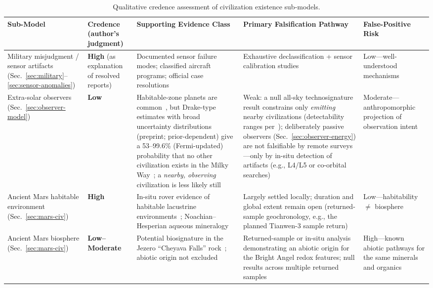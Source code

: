 \documentclass[aps,prd,twocolumn,superscriptaddress,nofootinbib]{revtex4-2}
\begin{document}
\begin{table}[htbp]
\caption{Qualitative credence assessment of civilization existence sub-models.}
\label{tab:bayesian-priors}
\footnotesize
\begin{tabular}{P{0.155\textwidth}P{0.090\textwidth}P{0.204\textwidth}P{0.244\textwidth}P{0.155\textwidth}}
\toprule
Sub-Model & Credence (author's judgment) & Supporting Evidence Class & Primary Falsification Pathway & False-Positive Risk \\
\midrule
Military misjudgment / sensor artifacts (Sec.~\ref{sec:military}--\ref{sec:sensor-anomalies}) & \textbf{High} (as explanation of resolved reports) & Documented sensor failure modes; classified aircraft programs; official case resolutions~\cite{AARO2026} & Exhaustive declassification + sensor calibration studies & Low---well-understood mechanisms \\
Extra-solar observers (Sec.~\ref{sec:observer-model}) & \textbf{Low} & Habitable-zone planets are common~\cite{Petigura2013}, but Drake-type estimates with broad uncertainty distributions (preprint; prior-dependent) give a 53--99.6\% (Fermi-updated) probability that no other civilization exists in the Milky Way~\cite{Sandberg2018}; a \textit{nearby, observing} civilization is less likely still & Weak: a null all-sky technosignature result constrains only \textit{emitting} nearby civilizations (detectability ranges per~\cite{Sheikh2025}); deliberately passive observers (Sec.~\ref{sec:observer-energy}) are not falsifiable by remote surveys---only by in-situ detection of artifacts (e.g., L4/L5 or co-orbital searches) & Moderate---anthropomorphic projection of observation intent \\
Ancient Mars habitable environment (Sec.~\ref{sec:mars-civ}) & \textbf{High} & In-situ rover evidence of habitable lacustrine environments~\cite{Grotzinger2014}; Noachian--Hesperian aqueous mineralogy & Largely settled locally; duration and global extent remain open (returned-sample geochronology, e.g., the planned Tianwen-3 sample return) & Low---habitability $\neq$ biosphere \\
Ancient Mars biosphere (Sec.~\ref{sec:mars-civ}) & \textbf{Low--Moderate} & Potential biosignature in the Jezero ``Cheyava Falls'' rock~\cite{Hurowitz2025}; abiotic origin not excluded & Returned-sample or in-situ analysis demonstrating an abiotic origin for the Bright Angel redox features; null results across multiple returned samples & High---known abiotic pathways for the same minerals and organics \\

\end{tabular}
\end{table}
\end{document}
